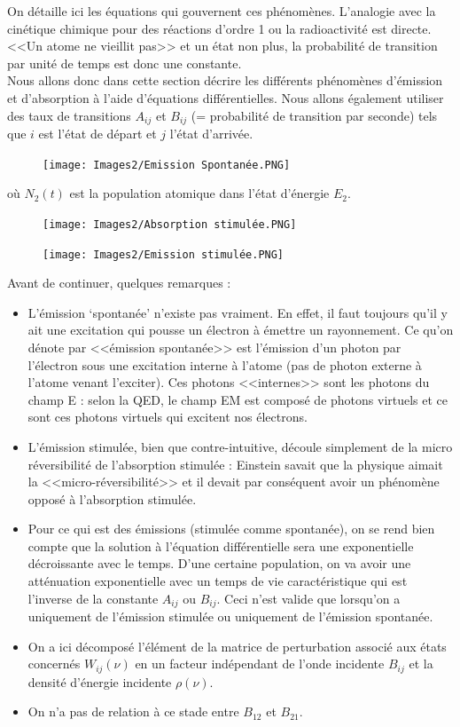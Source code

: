 On détaille ici les équations qui gouvernent ces phénomènes. L'analogie avec la cinétique chimique pour des réactions d'ordre 1 ou la radioactivité est directe. <<Un atome ne vieillit pas>> et un état non plus, la probabilité de transition par unité de temps est donc une constante.\\
Nous allons donc dans cette section décrire les différents phénomènes d'émission et d'absorption à l'aide d'équations différentielles. Nous allons également utiliser des taux de transitions $A_{ij}$ et $B_{ij}$ (= probabilité de transition par seconde) tels que $i$ est l'état de départ et $j$ l'état d'arrivée.
\begin{figure}[htp]
    \centering
    \texttt{[image: Images2/Emission Spontanée.PNG]}
    \label{fig:emission_spont}
\end{figure}
où $N_2(t)$ est la population atomique dans l'état d'énergie $E_2$.
\begin{figure}[htp]
    \texttt{[image: Images2/Absorption stimulée.PNG]}
    \label{fig:absorb_stimul}
\end{figure}
\begin{figure}[htp]
    \texttt{[image: Images2/Emission stimulée.PNG]}
    \label{fig:emission_stimul}
\end{figure}
Avant de continuer, quelques remarques :
\begin{itemize}[label=$\bullet$]
    \item L'émission `spontanée' n'existe pas vraiment. En effet, il faut toujours qu'il y ait une excitation qui pousse un électron à émettre un rayonnement. Ce qu'on dénote par <<émission spontanée>> est l'émission d'un photon par l'électron sous une excitation interne à l'atome (pas de photon externe à l'atome venant l'exciter). Ces photons <<internes>> sont les photons du champ E : selon la QED, le champ EM est composé de photons virtuels et ce sont ces photons virtuels qui excitent nos électrons.
    \item L'émission stimulée, bien que contre-intuitive, découle simplement de la micro réversibilité de l'absorption stimulée : Einstein savait que la physique aimait la <<micro-réversibilité>> et il devait par conséquent avoir un phénomène opposé à l'absorption stimulée.
    \item Pour ce qui est des émissions (stimulée comme spontanée), on se rend bien compte que la solution à l'équation différentielle sera une exponentielle décroissante avec le temps. D'une certaine population, on va avoir une atténuation exponentielle avec un temps de vie caractéristique qui est l'inverse de la constante $A_{ij}$ ou $B_{ij}$. Ceci n'est valide que lorsqu'on a uniquement de l'émission stimulée ou uniquement de l'émission spontanée.
    \item On a ici décomposé l'élément de la matrice de perturbation associé aux états concernés $W_{ij}(\nu)$ en un facteur indépendant de l'onde incidente $B_{ij}$ et la densité d'énergie incidente $\rho(\nu)$.
    \item On n’a pas de relation à ce stade entre $B_{12}$ et $B_{21}$.
\end{itemize}
